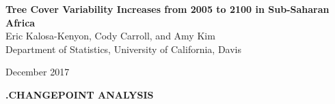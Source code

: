 \documentclass[12pt]{article}
\renewcommand{\baselinestretch}{1.6} %
\newcommand{\single}{\renewcommand{\baselinestretch}{1.2}\normalsize}
\newcommand{\double}{\renewcommand{\baselinestretch}{1.63}\normalsize}
\newcommand{\rs}{\vspace{-.2cm}}
\def\rs{\vspace{-.1in}}
\newcommand{\no}{\noindent}
\newcommand{\bc}{\begin{center}}
\newcommand{\ec}{\end{center}}
\newcommand{\sm}{}
\begin{document}
\thispagestyle{empty} \single \bc {\bf \sc \Large Tree Cover Variability Increases from 2005 to 2100
in Sub-Saharan Africa}
\vspace{0.15in}\\
Eric Kalosa-Kenyon, Cody Carroll, and Amy Kim \\
 Department of Statistics, University of California, Davis \\
 \ec \centerline{December 2017}



%

\newpage
{} \setcounter{page}{1}

\newpage
{} \setcounter{page}{1} \double

\bc {\bf {}.\quad CHANGEPOINT ANALYSIS }\sm \ec \rs
\end{document}
